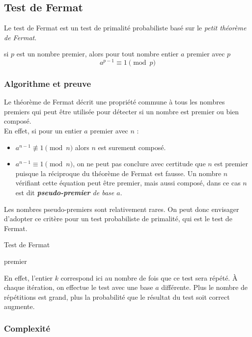 \subsection{Test de Fermat}
	Le test de Fermat est un test de primalité probabiliste basé sur le \textit{petit théorème de Fermat}.
	
	\vspace{-1.5em}\begin{adjustwidth}{1.5cm}{1.5cm} 
	\begin{Th}
		\label{ThFermat}
		si $p$ est un nombre premier, alors pour tout nombre entier $a$ premier avec $p$
		\[a^{p-1}\equiv 1 \pmod p\]
	\end{Th}
	\end{adjustwidth}\vspace{0.5em}
	
	\subsubsection{Algorithme et preuve}
		Le théorème de Fermat décrit une propriété commune à tous les nombres premiers qui peut être utilisée pour détecter si un nombre est premier ou bien composé.\\
		En effet, si pour un entier $a$ premier avec $n$ : 
		\begin{itemize}
		\item $a^{n-1} \not\equiv 1 \pmod n$ alors $n$ est surement composé.
		\item $a^{n-1}\equiv 1 \pmod n$, on ne peut pas conclure avec certitude que $n$ est premier puisque la réciproque du théorème de Fermat est fausse. Un nombre $n$ vérifiant cette équation peut être premier, mais aussi composé, dans ce cas $n$ est dit \textit{\textbf{pseudo-premier} de base $a$}.
		\end{itemize}
		Les nombres pseudo-premiers sont relativement rares. On peut donc envisager d'adopter ce critère pour un test probabiliste de primalité, qui est le test de Fermat.\\
		
		\begin{algorithm}[H]
			\caption{Test de Fermat}\label{TF}
		\Retour premier\;
		\end{algorithm}
		
		En effet, l'entier $k$ correspond ici au nombre de fois que ce test sera répété. À chaque itération, on effectue le test avec une base $a$ différente. Plus le nombre de répétitions est grand, plus la probabilité que le résultat du test soit correct augmente.

	\subsubsection{Complexité}